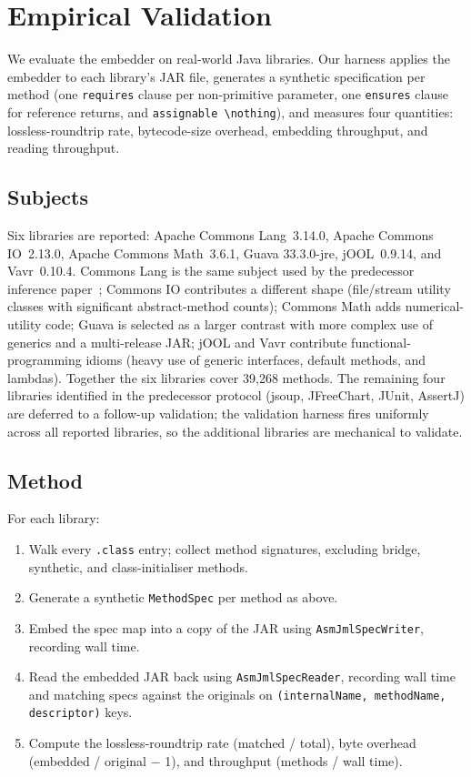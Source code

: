 \section{Empirical Validation}
\label{sec:empirical}

We evaluate the embedder on real-world Java libraries. Our harness applies the embedder to each library's JAR file, generates a synthetic specification per method (one \texttt{requires} clause per non-primitive parameter, one \texttt{ensures} clause for reference returns, and \texttt{assignable~\textbackslash nothing}), and measures four quantities: lossless-roundtrip rate, bytecode-size overhead, embedding throughput, and reading throughput.

\subsection{Subjects}

Six libraries are reported: Apache Commons Lang~3.14.0, Apache Commons IO~2.13.0, Apache Commons Math~3.6.1, Guava 33.3.0-jre, jOOL~0.9.14, and Vavr~0.10.4. Commons Lang is the same subject used by the predecessor inference paper~\cite{edmonds2026inference}; Commons IO contributes a different shape (file/stream utility classes with significant abstract-method counts); Commons Math adds numerical-utility code; Guava is selected as a larger contrast with more complex use of generics and a multi-release JAR; jOOL and Vavr contribute functional-programming idioms (heavy use of generic interfaces, default methods, and lambdas). Together the six libraries cover 39{,}268 methods. The remaining four libraries identified in the predecessor protocol (jsoup, JFreeChart, JUnit, AssertJ) are deferred to a follow-up validation; the validation harness fires uniformly across all reported libraries, so the additional libraries are mechanical to validate.

\subsection{Method}

For each library:

\begin{enumerate}
    \item Walk every \texttt{.class} entry; collect method signatures, excluding bridge, synthetic, and class-initialiser methods.
    \item Generate a synthetic \texttt{MethodSpec} per method as above.
    \item Embed the spec map into a copy of the JAR using \texttt{AsmJmlSpecWriter}, recording wall time.
    \item Read the embedded JAR back using \texttt{AsmJmlSpecReader}, recording wall time and matching specs against the originals on \texttt{(internalName, methodName, descriptor)} keys.
    \item Compute the lossless-roundtrip rate (matched / total), byte overhead (embedded / original $-$ 1), and throughput (methods / wall time).
\end{enumerate}

